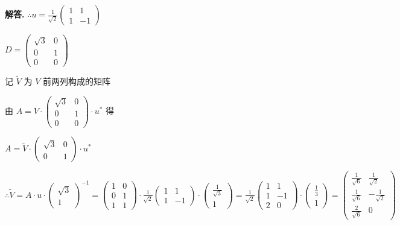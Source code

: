 \documentclass[12pt, a4paper, oneside]{ctexart}
\newenvironment{solution}{\par\noindent\textbf{解答. }}{\par}
\begin{document}
\begin{solution}
        $\therefore u=\frac{1}{\sqrt{2}}\left(\begin{array}{cc}1 & 1 \\1 & -1\end{array}\right) $
    
        $D=\left(\begin{array}{ll}\sqrt{3} & 0 \\0 & 1 \\0 & 0\end{array}\right)$
    

        记  $\widetilde{V}$  为  $V $ 前两列构成的矩阵

        由 $ A=V \cdot\left(\begin{array}{cc}\sqrt{3} & 0 \\0 & 1 \\0 & 0\end{array}\right) \cdot u^{*} $ 得 
    
        $A=\widetilde{V} \cdot\left(\begin{array}{ll}\sqrt{3} & 0 \\0 & 1\end{array}\right) \cdot u^{*} $
    
        $\therefore \widetilde{V}=A \cdot u \cdot\left(\begin{array}{l}\sqrt{3} \\1\end{array}\right)^{-1}=\left(\begin{array}{ll}1 & 0 \\0 & 1 \\1 & 1\end{array}\right) \cdot \frac{1}{\sqrt{2}}\left(\begin{array}{cc}1 & 1 \\1 & -1\end{array}\right) \cdot\left(\begin{array}{c}\frac{1}{\sqrt{3}} \\1\end{array}\right)=\frac{1}{\sqrt{2}}\left(\begin{array}{cc}1 & 1 \\1 & -1 \\2 & 0\end{array}\right) \cdot\left(\begin{array}{c}\frac{1}{3} \\1\end{array}\right)=\left(\begin{array}{cc}\frac{1}{\sqrt{6}} & \frac{1}{\sqrt{2}} \\\frac{1}{\sqrt{6}} & -\frac{1}{\sqrt{2}} \\\frac{2}{\sqrt{6}} & 0\end{array}\right) $
    

\end{solution}
\end{document}
